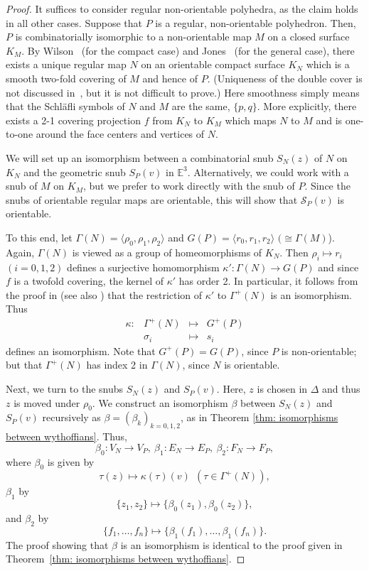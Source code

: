 \documentclass[12pt]{article}
\theoremstyle{definition}\newtheorem{definition}{Definition}[section]
\begin{document}
\begin{proof}
It suffices to consider regular non-orientable polyhedra, as the claim holds in all other cases. Suppose that $P$ is a regular, non-orientable polyhedron. Then, $P$ is combinatorially isomorphic to a non-orientable map $M$ on a closed surface $K_M$. By Wilson~\cite{Wilson} (for the compact case) and Jones~\cite{Jones} (for the general case), there exists a unique regular map $N$ on an orientable compact surface $K_N$ which is a smooth two-fold covering of $M$ and hence of $P$. (Uniqueness of the double cover is not discussed in~\cite{Jones}, but it is not difficult to prove.) Here smoothness simply means that the Schläfli symbols of $N$ and $M$ are the same, $\{p,q\}$. More explicitly, there exists a 2-1 covering projection $f$ from $K_N$ to $K_M$ which maps $N$ to $M$ and is one-to-one around the face centers and vertices of $N$.\smallskip 

We will set up an isomorphism between a combinatorial snub ${S}_N(z)$ of $N$ on $K_N$ and the geometric snub ${S}_P(v)$ in $\mathbb{E}^3$. Alternatively, we could work with a snub of $M$ on $K_M$, but we prefer to work directly with the snub of $P$. Since the snubs of orientable regular maps are orientable, this will show that $\mathcal{S}_P(v)$ is orientable.\smallskip 

To this end, let $\Gamma(N)=\langle \rho_0, \rho_1, \rho_2 \rangle$ and $G(P) = \langle r_0, r_1,r_2\rangle$ $(\cong \Gamma(M)$). Again, $\Gamma(N)$ is viewed as a group of homeomorphisms of $K_N$. Then $\rho_i\mapsto r_i$ $(i=0,1,2)$ defines a surjective homomorphism $\kappa':\Gamma(N) \rightarrow G(P)$ and since $f$ is a twofold covering, the kernel of $\kappa'$ has order 2. In particular, it follows from the proof in \cite{Wilson} (see also \cite{Conder Wilson}) that the restriction of $\kappa'$ to $\Gamma^+(N)$ is an isomorphism. Thus 
\[\begin{array}{rrcl}
\kappa:& \Gamma^+(N)& \mapsto& G^+(P)\\
       & \sigma_i &\mapsto& s_i
\end{array}\]
defines an isomorphism. Note that $G^+(P) = G(P)$, since $P$ is non-orientable; but that $\Gamma^+(N)$ has index 2 in $\Gamma(N)$, since $N$ is orientable.\smallskip 

Next, we turn to the snubs ${S}_N(z)$ and ${S}_P(v)$. Here, $z$ is chosen in $\Delta$ and thus $z$ is moved under $\rho_0$. We construct an isomorphism $\beta$ between ${S}_N(z)$ and ${S}_P(v)$ recursively as $\beta = (\beta_k)_{k=0,1,2}$, as in Theorem \ref{thm: isomorphisms between wythoffians}. Thus, $$\beta_0: V_N \rightarrow V_P, \ \beta_1:E_N \rightarrow E_P, \ \beta_2:F_N \rightarrow F_P,$$ where $\beta_0$ is given by $$\tau(z)\mapsto \kappa(\tau)(v) \ \ (\tau\in \Gamma^+(N)),$$ 
$\beta_1$ by 
$$\{z_1,z_2\} \mapsto \{\beta_0(z_1),\beta_0(z_2)\},$$ 
and $\beta_2$ by
$$\{f_1,\dots,f_n\} \mapsto \{\beta_1(f_1),\dots,\beta_1(f_n)\}.$$ The proof showing that $\beta$ is an isomorphism is identical to the proof given in Theorem~\ref{thm: isomorphisms between wythoffians}. 
\end{proof}
\smallskip
\end{document}
